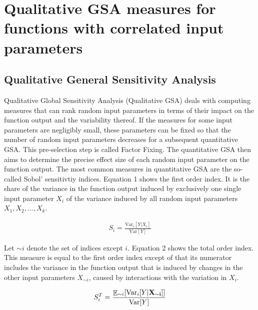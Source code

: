 \documentclass[a4paper,12pt]{article}
\DeclareMathOperator*{\E}{\mathbb{E}}
\begin{document}
\newpage %

\section{Qualitative GSA measures for functions with correlated input parameters}
\thispagestyle{plain} %

\subsection{Qualitative General Sensitivity Analysis}
\noindent
Qualitative Global Sensitivity Analysis (Qualitative GSA) deals with computing measures that can rank random input parameters in terms of their impact on the function output and the variability thereof. If the measures for some input parameters are negligibly small, these parameters can be fixed so that the number of random input parameters decreases for a subsequent quantitative GSA. This pre-selection step is called Factor Fixing. The quantitative GSA then aims to determine the precise effect size of each random input parameter on the function output. The most common measures in quantitative GSA are the so-called Sobol' sensitivtiy indices. Equation 1 shows the first order index. It is the share of the variance in the function output induced by exclusively one single input parameter $X_i$ of the variance induced by all random input parameters $X_1, X_2, ..., X_k$.


\begin{align}
S_i = \frac{\text{Var}_i[Y|X_i ]}{\text{Var}[Y]}
\end{align}

\noindent
Let $\sim i$ denote the set of indices except $i$. Equation 2 shows the total order index. This measure is equal to the first order index except of that its numerator includes the variance in the function output that is induced by changes in the other input parameters $X_{\sim i}$, caused by interactions with the variation in $X_i$.

\begin{align}
S_{i}^T = \frac{\E_{\sim i}[\text{Var}_{i}[Y|\bold{X_{\sim i}]]}}{\text{Var}[Y]}
\end{align}
\end{document}
